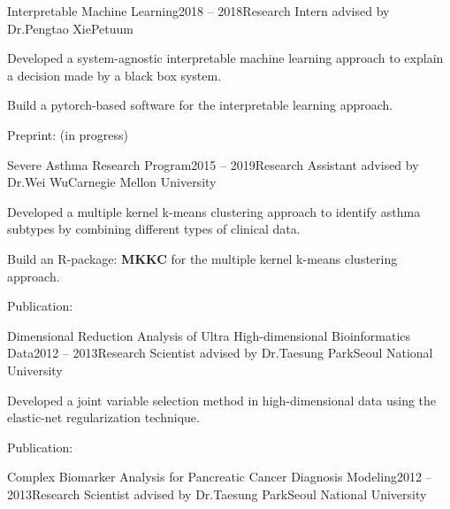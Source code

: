 \documentclass{tidycv} %
\begin{document}
\begin{cvresearches}
\begin{cvresearch}{Interpretable Machine Learning}{2018 -- 2018}{Research Intern advised by Dr.\@ Pengtao Xie}{Petuum}
 \item Developed a system-agnostic interpretable machine learning approach to explain a decision made by a black box system.
 \item Build a pytorch-based software for the interpretable learning approach.
 \item Preprint: \cite{bang2019explaining} (in progress)
\end{cvresearch}
\begin{cvresearch}{Severe Asthma Research Program}{2015 -- 2019}{Research Assistant advised by Dr.\@ Wei Wu}{Carnegie Mellon University}
 \item Developed a multiple kernel k-means clustering approach to identify asthma subtypes by combining different types of clinical data.
 \item Build an R-package: {\bf MKKC} for the multiple kernel k-means clustering approach.
 \item Publication: \cite{bang2018multiple, wu2018asthma, bang2016naive}
\end{cvresearch}
\begin{cvresearch}{Dimensional Reduction Analysis of Ultra High-dimensional Bioinformatics Data}{2012 -- 2013}{Research Scientist advised by Dr.\@ Taesung Park}{Seoul National University}
 \item Developed a joint variable selection method in high-dimensional data using the elastic-net regularization technique.
 \item Publication: \cite{bang2012joint}
\end{cvresearch}
\begin{cvresearch}{Complex Biomarker Analysis for Pancreatic Cancer Diagnosis Modeling}{2012 -- 2013}{Research Scientist advised by Dr.\@ Taesung Park}{Seoul National University}

\end{cvresearch}
\end{cvresearches}
\end{document}
